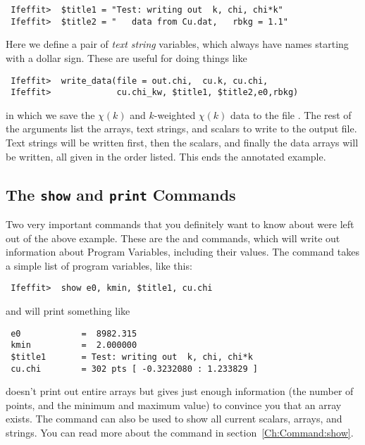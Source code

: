 \begin{verbatim}
 Ifeffit>  $title1 = "Test: writing out  k, chi, chi*k"
 Ifeffit>  $title2 = "   data from Cu.dat,   rbkg = 1.1"
\end{verbatim}\noindent
Here we define a pair of {\emph{text string}} variables, which always have
names starting with a dollar sign.  These are useful for doing
things like
\begin{verbatim}
 Ifeffit>  write_data(file = out.chi,  cu.k, cu.chi, 
 Ifeffit>             cu.chi_kw, $title1, $title2,e0,rbkg)
\end{verbatim}\noindent
in which we save the $\chi(k)$ and $k$-weighted $\chi(k)$ data to the file
{}.  The rest of the arguments list the arrays, text strings,
and scalars to write to the output file.  Text strings will be written
first, then the scalars, and finally the data arrays will be written, all
given in the order listed.  This ends the annotated example.


\subsection{The {\texttt{show}} and {\texttt{print}}  Commands} 
\label{Ch:Basics-show} 

Two very important commands that you definitely want to know about were
left out of the above example.  These are the {} and
{} commands, which will write out information about Program
Variables, including their values.  The {} command takes a
simple list of program variables, like this:
\begin{verbatim}
 Ifeffit>  show e0, kmin, $title1, cu.chi
\end{verbatim}\noindent
and will print something like 
\begin{verbatim} 
 e0            =  8982.315 
 kmin          =  2.000000
 $title1       = Test: writing out  k, chi, chi*k
 cu.chi        = 302 pts [ -0.3232080 : 1.233829 ]
\end{verbatim}  
\noindent
{} doesn't print out entire arrays but gives just enough
information (the number of points, and the minimum and maximum value) to
convince you that an array exists.  The {} command can also be
used to show all current scalars, arrays, and strings.  You can read more
about the {} command in section~{\ref{Ch:Command:show}}.

